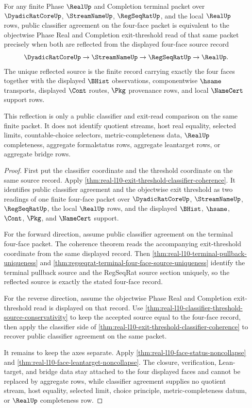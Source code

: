 \begin{theorem}
\label{thm:real-l10-four-face-exit-classifier-reflection}
For any finite Phase $\RealUp$ and Completion terminal packet over $\DyadicRatCoreUp$, $\StreamNameUp$, $\RegSeqRatUp$, and the local $\RealUp$ rows, public classifier agreement on the four-face packet is equivalent to the objectwise Phase Real and Completion exit-threshold read of that same packet precisely when both are reflected from the displayed four-face source record
$$
\DyadicRatCoreUp \to \StreamNameUp \to \RegSeqRatUp \to \RealUp.
$$
The unique reflected source is the finite record carrying exactly the four faces together with the displayed $\BHist$ observations, componentwise $\hsame$ transports, displayed $\Cont$ routes, $\Pkg$ provenance rows, and local $\NameCert$ support rows.

This reflection is only a public classifier and exit-read comparison on the same finite packet. It does not identify quotient streams, host real equality, selected limits, countable-choice selectors, metric-completeness data, $\RealUp$ completeness, aggregate formalstatus rows, aggregate leantarget rows, or aggregate bridge rows.
\end{theorem}
\begin{proof}
First put the classifier coordinate and the threshold coordinate on the same source record. Apply \autoref{thm:real-l10-exit-threshold-classifier-coherence}. It identifies public classifier agreement and the objectwise exit threshold as two readings of one finite four-face packet over $\DyadicRatCoreUp$, $\StreamNameUp$, $\RegSeqRatUp$, the local $\RealUp$ rows, and the displayed $\BHist$, $\hsame$, $\Cont$, $\Pkg$, and $\NameCert$ support.

For the forward direction, assume public classifier agreement on the terminal four-face packet. The coherence theorem reads the accompanying exit-threshold coordinate from the same displayed record. Then \autoref{thm:real-l10-terminal-pullback-uniqueness} and \autoref{thm:regseqrat-terminal-four-face-source-uniqueness} identify the terminal pullback source and the RegSeqRat source section uniquely, so the reflected source is exactly the stated four-face record.

For the reverse direction, assume the objectwise Phase Real and Completion exit-threshold read is displayed on that record. Use \autoref{thm:real-l10-classifier-threshold-source-conservativity} to keep the accepted source equal to the four-face record, then apply the classifier side of \autoref{thm:real-l10-exit-threshold-classifier-coherence} to recover public classifier agreement on the same packet.

It remains to keep the axes separate. Apply \autoref{thm:real-l10-face-status-noncollapse} and \autoref{thm:real-l10-face-leantarget-noncollapse}. The closure, verification, Lean-target, and bridge data stay attached to the four displayed faces and cannot be replaced by aggregate rows, while classifier agreement supplies no quotient stream, host equality, selected limit, choice principle, metric-completeness datum, or $\RealUp$ completeness row.
\end{proof}

